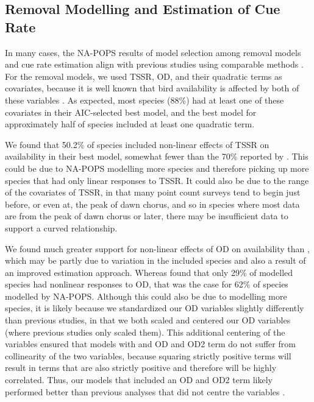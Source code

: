 \subsection{Removal Modelling and Estimation of Cue Rate}

\par In many cases, the NA-POPS results of model selection among removal models and cue rate estimation align with previous studies using comparable methods \citep{solymos_calibrating_2013, solymos_evaluating_2018}. For the removal models, we used TSSR, OD, and their quadratic terms as covariates, because it is well known that bird availability is affected by both of these variables \citep{wilson_reliability_1985}. As expected, most species (88\%) had at least one of these covariates in their AIC-selected best model, and the best model for approximately half of species included at least one quadratic term. 

\par We found that 50.2\% of species included non-linear effects of TSSR on availability in their best model, somewhat fewer than the 70\% reported by \citet{solymos_evaluating_2018}. This could be due to NA-POPS modelling more species and therefore picking up more species that had only linear responses to TSSR. It could also be due to the range of the covariates of TSSR, in that many point count surveys tend to begin just before, or even at, the peak of dawn chorus, and so in species where most data are from the peak of dawn chorus or later, there may be insufficient data to support a curved relationship.

\par We found much greater support for non-linear effects of OD on availability than \citet{solymos_evaluating_2018}, which may be partly due to variation in the included species and also a result of an improved estimation approach. Whereas \citet{solymos_evaluating_2018} found that only 29\% of modelled species had nonlinear responses to OD, that was the case for 62\% of species modelled by NA-POPS. Although this could also be due to modelling more species, it is likely because we standardized our OD variables slightly differently than previous studies, in that we both scaled and centered our OD variables (where previous studies only scaled them). This additional centering of the variables ensured that models with and OD and OD2 term do not suffer from collinearity of the two variables, because squaring strictly positive terms will result in terms that are also strictly positive and therefore will be highly correlated. Thus, our models that included an OD and OD2 term likely performed better than previous analyses that did not centre the variables \citep{solymos_calibrating_2013, solymos_evaluating_2018}. 

